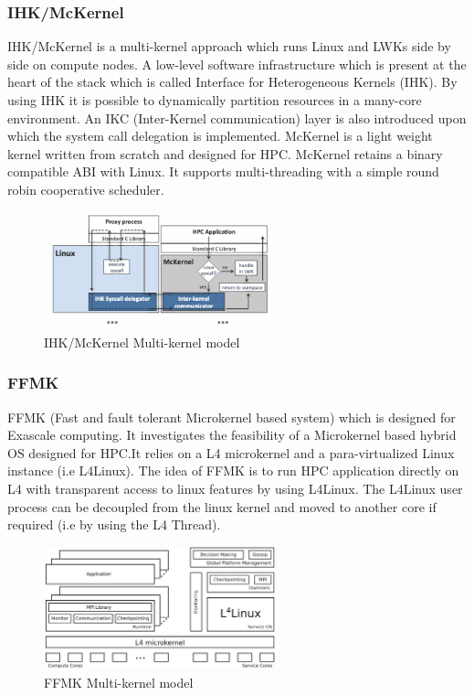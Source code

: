 \subsubsection{IHK/McKernel}
IHK/McKernel\cite{McKernel} is a multi-kernel approach 
which runs Linux and LWKs side by side on 
compute nodes. A low-level software infrastructure
which is present at the heart of the stack 
which is called Interface for Heterogeneous
Kernels (IHK). By using IHK it is 
possible to dynamically partition resources 
in a many-core environment. An IKC (Inter-Kernel 
communication) layer is also introduced upon which 
the system call delegation is implemented. 
McKernel is a light weight kernel written 
from scratch and designed for HPC. McKernel
retains a binary compatible ABI with Linux. 
It supports multi-threading with a simple 
round robin cooperative scheduler. 
\begin{figure}[htbp!] 
  \centering    
  \includegraphics[width=0.6\textwidth]{FigsMultikernel/mckernel}
  \caption[Multi-kernel]{IHK/McKernel Multi-kernel model \cite{McKernel}}
  \label{fig:McKernel}
  \end{figure}


\subsubsection{FFMK}
FFMK\cite{FFMK} (Fast and fault tolerant Microkernel based system) which 
is designed for Exascale computing. It investigates 
the feasibility of a Microkernel based hybrid OS designed 
for HPC.It relies on a L4 microkernel and a para-virtualized
Linux instance (i.e L4Linux\cite{l4linux}).
The idea of FFMK is to run HPC application directly on 
L4 with transparent access to linux features by using 
L4Linux. The L4Linux user process can be decoupled 
from the linux kernel and moved to another core 
if required (i.e by using the L4 Thread).
\begin{figure}[htbp!] 
  \centering    
  \includegraphics[width=0.6\textwidth]{FigsMultikernel/ffmk}
  \caption[Multi-kernel]{FFMK Multi-kernel model \cite{FFMK}}
  \label{fig:FMK}
  \end{figure}

